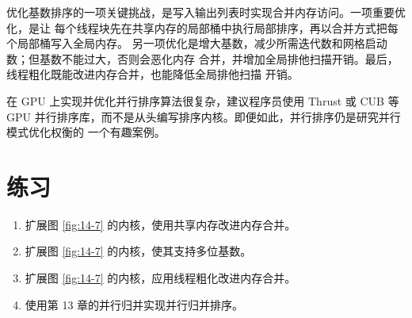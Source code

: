 优化基数排序的一项关键挑战，是写入输出列表时实现合并内存访问。一项重要优化，是让
每个线程块先在共享内存的局部桶中执行局部排序，再以合并方式把每个局部桶写入全局内存。
另一项优化是增大基数，减少所需迭代数和网格启动数；但基数不能过大，否则会恶化内存
合并，并增加全局排他扫描开销。最后，线程粗化既能改进内存合并，也能降低全局排他扫描
开销。

在 GPU 上实现并优化并行排序算法很复杂，建议程序员使用 Thrust
\cite{bell2012thrust-sort,nvidia-thrust-sort} 或 CUB\cite{nvidia-cub-sort} 等 GPU
并行排序库，而不是从头编写排序内核。即便如此，并行排序仍是研究并行模式优化权衡的
一个有趣案例。

\section*{练习}

\begin{enumerate}[label=\arabic*.,leftmargin=2.7em]
  \item 扩展图 \ref{fig:14-7} 的内核，使用共享内存改进内存合并。
  \item 扩展图 \ref{fig:14-7} 的内核，使其支持多位基数。
  \item 扩展图 \ref{fig:14-7} 的内核，应用线程粗化改进内存合并。
  \item 使用第 13 章的并行归并实现并行归并排序。
\end{enumerate}

